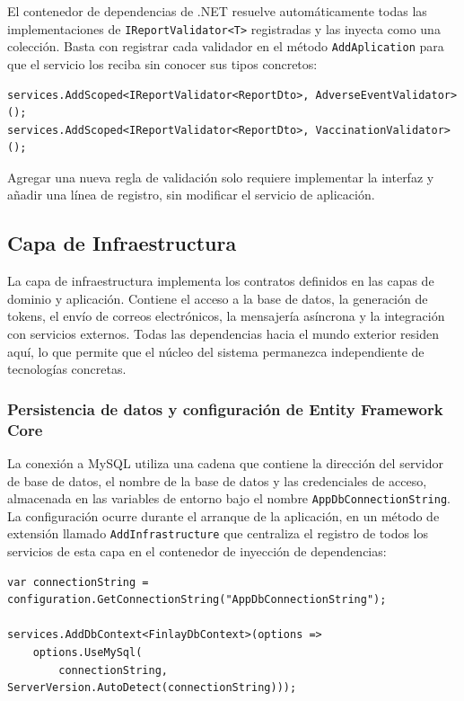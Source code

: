 El contenedor de dependencias de .NET resuelve automáticamente todas las implementaciones de \texttt{IReportValidator<T>} registradas y las inyecta como una colección. Basta con registrar cada validador en el método \texttt{AddAplication} para que el servicio los reciba sin conocer sus tipos concretos:

\begin{lstlisting}[language={[Sharp]C}, caption={Registro de validadores en el contenedor}, label={lst:validator_registration}]
services.AddScoped<IReportValidator<ReportDto>, AdverseEventValidator>();
services.AddScoped<IReportValidator<ReportDto>, VaccinationValidator>();
\end{lstlisting}

Agregar una nueva regla de validación solo requiere implementar la interfaz y añadir una línea de registro, sin modificar el servicio de aplicación.


\subsection{Capa de Infraestructura}

La capa de infraestructura implementa los contratos definidos en las capas de dominio y aplicación. Contiene el acceso a la base de datos, la generación de tokens, el envío de correos electrónicos, la mensajería asíncrona y la integración con servicios externos. Todas las dependencias hacia el mundo exterior residen aquí, lo que permite que el núcleo del sistema permanezca independiente de tecnologías concretas.


\subsubsection{Persistencia de datos y configuración de Entity Framework Core}
La conexión a MySQL utiliza una cadena que contiene la dirección del servidor de base de datos, el nombre de la base de datos y las credenciales de acceso, almacenada en las variables de entorno bajo el nombre \texttt{AppDbConnectionString}.
La configuración ocurre durante el arranque de la aplicación, en un método de extensión llamado \texttt{AddInfrastructure} que centraliza el registro de todos los servicios de esta capa en el contenedor de inyección de dependencias:

\begin{lstlisting}[language={[Sharp]C}, caption={Configuración de la conexión a MySQL}, label={lst:mysqlconfig}]
var connectionString = configuration.GetConnectionString("AppDbConnectionString");

services.AddDbContext<FinlayDbContext>(options =>
    options.UseMySql(
        connectionString, ServerVersion.AutoDetect(connectionString)));
\end{lstlisting}

